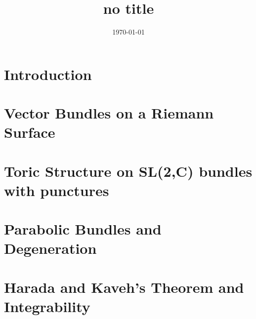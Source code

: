 \documentclass[]{article}
\title{no title}
\date{\today}
\begin{document}
\section{Introduction}
\section{Vector Bundles on a Riemann Surface}
\section{Toric Structure on SL(2,C) bundles with punctures}
\section{Parabolic Bundles and Degeneration}
\section{Harada and Kaveh's Theorem and Integrability}
\end{document}
